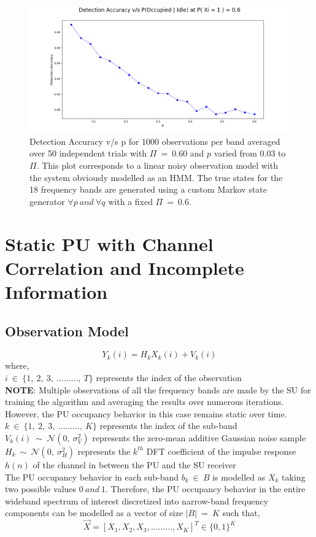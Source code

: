 \documentclass[12pt, draftcls, onecolumn]{IEEEtran}
\begin{document}
\begin{figure}[t]
\includegraphics[width=1.0\textwidth]{DetectionAccuracy_v_p_test_3_final.png}
\caption{Detection Accuracy v/s p for $1000$ observations per band averaged over 50 independent trials with $\Pi\ =\ 0.60$ and $p$ varied from $0.03$ to $\Pi$. This plot corresponds to a linear noisy observation model with the system obviously modelled as an HMM. The true states for the 18 frequency bands are generated using a custom Markov state generator $\forall p\ and\ \forall q$ with a fixed $\Pi\ =\ 0.6$.}
\label{fig:mesh3}
\centering
\end{figure}
\clearpage
\section{Static PU with Channel Correlation and Incomplete Information}
\subsection{Observation Model}
\begin{equation}\label{28}
    Y_k(i) = H_kX_k(i) + V_k(i)
\end{equation}
where,
\\$i\ \in\ \{1,\ 2,\ 3,\ .........,\ T\}$ represents the index of the observation
\\\textbf{NOTE}: Multiple observations of all the frequency bands are made by the SU for training the algorithm and averaging the results over numerous iterations. However, the PU occupancy behavior in this case remains static over time.
\\$k\ \in\ \{1,\ 2,\ 3,\ .........,\ K\}$ represents the index of the sub-band
\\$V_k(i)\ \sim\ \mathcal{N}(0,\ \sigma_V^2)$ represents the zero-mean additive Gaussian noise sample
\\$H_k\ \sim\ \mathcal{N}(0,\ \sigma_H^2)$ represents the $k^{th}$ DFT coefficient of the impulse response $h(n)$ of the channel in between the PU and the SU receiver
\\The PU occupancy behavior in each sub-band $b_k\ \in\ B$ is modelled as $X_k$ taking two possible values $0\ and\ 1$. Therefore, the PU occupancy behavior in the entire wideband spectrum of interest discretized into narrow-band frequency components can be modelled as a vector of size $|B|\ =\ K$ such that,
\begin{equation}\label{29}
    \vec{X} = [X_1, X_2, X_3, ........., X_K]^T \in \{0,1\}^K
\end{equation}
\end{document}

